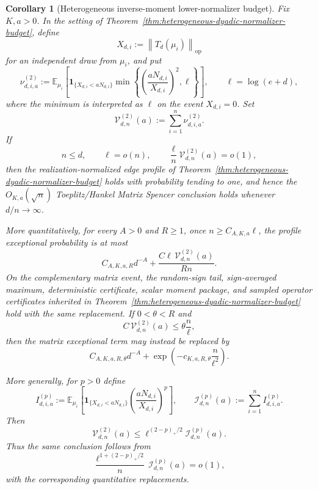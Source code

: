 \documentclass[11pt]{amsart}
\numberwithin{equation}{section}
\newtheorem{corollary}[theorem]{Corollary}
\theoremstyle{definition}
\theoremstyle{remark}
\newcommand{\op}{\mathrm{op}}
\newcommand{\Exp}{\mathbb E}
\newcommand{\norm}[1]{\left\lVert #1\right\rVert}
\begin{document}
\begin{corollary}[Heterogeneous inverse-moment lower-normalizer budget]
\label{cor:heterogeneous-invmoment-normalizer-budget}
Fix \(K,a>0\).  In the setting of
Theorem~\ref{thm:heterogeneous-dyadic-normalizer-budget}, define
\[
  X_{d,i}:=\norm{T_d(\mu_i)}_{\op}
\]
for an independent draw from \(\mu_i\), and put
\[
  \nu_{d,i,a}^{(2)}
  :=
  \Exp_{\mu_i}\left[
  \mathbf 1_{\{X_{d,i}<aN_{d,i}\}}
  \min\left\{
  \left(\frac{aN_{d,i}}{X_{d,i}}\right)^2,\ell
  \right\}
  \right],
  \qquad \ell=\log(e+d),
\]
where the minimum is interpreted as \(\ell\) on the event \(X_{d,i}=0\).
Set
\[
  \mathcal V_{d,n}^{(2)}(a):=
  \sum_{i=1}^n\nu_{d,i,a}^{(2)}.
\]
If
\[
  n\le d,\qquad \ell=o(n),\qquad
  \frac{\ell}{n}\mathcal V_{d,n}^{(2)}(a)=o(1),
\]
then the realization-normalized edge profile of
Theorem~\ref{thm:heterogeneous-dyadic-normalizer-budget} holds with probability
tending to one, and hence the \(O_{K,a}(\sqrt n)\) Toeplitz/Hankel Matrix
Spencer conclusion holds whenever \(d/n\to\infty\).

More quantitatively, for every \(A>0\) and \(R\ge1\), once
\(n\ge C_{A,K,a}\ell\), the profile exceptional probability is at most
\[
  C_{A,K,a,R}d^{-A}
  +\frac{C\ell\,\mathcal V_{d,n}^{(2)}(a)}{Rn}.
\]
On the complementary matrix event, the random-sign tail, sign-averaged maximum,
deterministic certificate, scalar moment package, and sampled operator
certificates inherited in
Theorem~\ref{thm:heterogeneous-dyadic-normalizer-budget} hold with the same
replacement.  If \(0<\theta<R\) and
\[
  C\,\mathcal V_{d,n}^{(2)}(a)\le \theta\frac n\ell ,
\]
then the matrix exceptional term may instead be replaced by
\[
  C_{A,K,a,R,\theta}d^{-A}
  +\exp\left(-c_{K,a,R,\theta}\frac n{\ell^2}\right).
\]

More generally, for \(p>0\) define
\[
  I_{d,i,a}^{(p)}
  :=
  \Exp_{\mu_i}\left[
  \mathbf 1_{\{X_{d,i}<aN_{d,i}\}}
  \left(\frac{aN_{d,i}}{X_{d,i}}\right)^p
  \right],
  \qquad
  \mathcal I_{d,n}^{(p)}(a):=\sum_{i=1}^n I_{d,i,a}^{(p)}.
\]
Then
\[
  \mathcal V_{d,n}^{(2)}(a)
  \le
  \ell^{(2-p)_+/2}\mathcal I_{d,n}^{(p)}(a).
\]
Thus the same conclusion follows from
\[
  \frac{\ell^{1+(2-p)_+/2}}{n}\,
  \mathcal I_{d,n}^{(p)}(a)=o(1),
\]
with the corresponding quantitative replacements.
\end{corollary}
\end{document}

